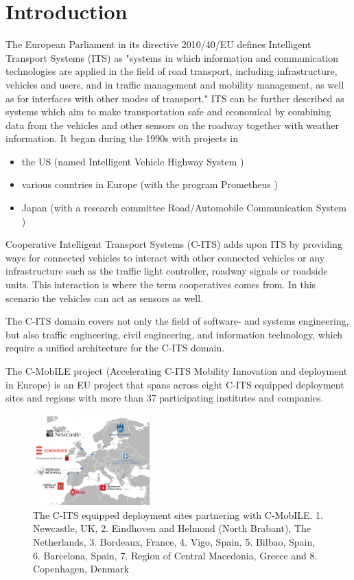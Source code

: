 \documentclass[conference]{IEEEtran}
\begin{document}
\section{Introduction}

The European Parliament in its directive 2010/40/EU \cite{ec} defines Intelligent Transport Systems (ITS) as "systems in which information and communication technologies are applied in the field of road transport, including infrastructure, vehicles and users, and in traffic management and mobility management, as well as for interfaces with other modes of transport."
ITS can be further described as systems which aim to make transportation safe and economical by combining data from the vehicles and other sensors on the roadway together with weather information. It began during the 1990s\cite{itsbegin} with projects in
\begin{itemize}
	\item the US (named Intelligent Vehicle Highway System \cite{ivhs})
	\item various countries in Europe (with the program Prometheus \cite{prometheus})
	\item Japan (with a research committee Road/Automobile Communication System \cite{racs})
\end{itemize}

Cooperative Intelligent Transport Systems (C-ITS) \cite{c-its} adds upon ITS by providing ways for connected vehicles to interact with other connected vehicles or any infrastructure such as the traffic light controller, roadway signals or roadside units. This interaction is where the term cooperatives comes from. In this scenario the vehicles can act as sensors as well.

The C-ITS domain covers not only the field of software- and systems engineering, but also traffic engineering, civil engineering, and information technology, which require a unified architecture for the C-ITS domain.

The C-MobILE project (Accelerating C-ITS Mobility Innovation and deployment in Europe) is an EU project that spans across eight C-ITS equipped deployment sites and regions with more than 37 participating institutes and companies.


\begin{figure}[ht!]
	\centering
	\includegraphics[width=0.4\textwidth]{deploymentsites}
	\caption{The C-ITS equipped deployment sites partnering with C-MobILE. 1. Newcastle, UK, 2. Eindhoven and Helmond (North Brabant), The Netherlands, 3. Bordeaux, France, 4. Vigo, Spain, 5. Bilbao, Spain, 6. Barcelona, Spain, 7. Region of Central Macedonia, Greece and 8. Copenhagen, Denmark}
	\label{fig:deployment sites}
\end{figure}	
\end{document}

